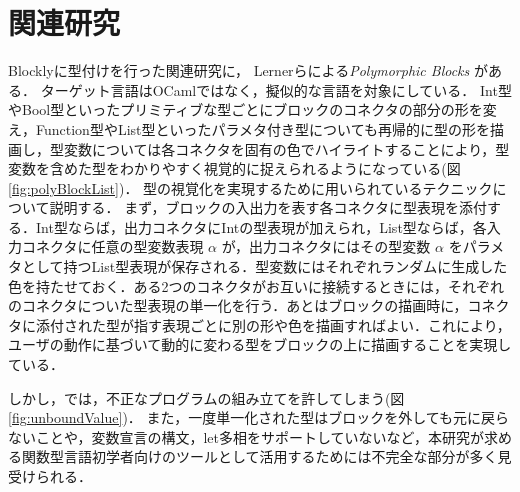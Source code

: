 \chapter{関連研究}\label{chap:senko}

Blocklyに型付けを行った関連研究に，
Lernerらによる{\it Polymorphic Blocks} \cite{Typed-Blockly}がある．
ターゲット言語はOCamlではなく，擬似的な言語を対象にしている．
Int型やBool型といったプリミティブな型ごとにブロックのコネクタの部分の形を変え，Function型やList型といったパラメタ付き型についても再帰的に型の形を描画し，型変数については各コネクタを固有の色でハイライトすることにより，型変数を含めた型をわかりやすく視覚的に捉えられるようになっている(図\ref{fig:polyBlockList})．
型の視覚化を実現するために用いられているテクニックについて説明する．
まず，ブロックの入出力を表す各コネクタに型表現を添付する．Int型ならば，出力コネクタにIntの型表現が加えられ，List型ならば，各入力コネクタに任意の型変数表現 $\alpha$ が，出力コネクタにはその型変数 $\alpha$ をパラメタとして持つList型表現が保存される．型変数にはそれぞれランダムに生成した色を持たせておく．ある2つのコネクタがお互いに接続するときには，それぞれのコネクタについた型表現の単一化を行う．あとはブロックの描画時に，コネクタに添付された型が指す表現ごとに別の形や色を描画すればよい．これにより，ユーザの動作に基づいて動的に変わる型をブロックの上に描画することを実現している．

しかし，\cite{Typed-Blockly}では，不正なプログラムの組み立てを許してしまう(図\ref{fig:unboundValue})．
また，一度単一化された型はブロックを外しても元に戻らないことや，変数宣言の構文，let多相\cite{AkaHon}をサポートしていないなど，本研究が求める関数型言語初学者向けのツールとして活用するためには不完全な部分が多く見受けられる．

